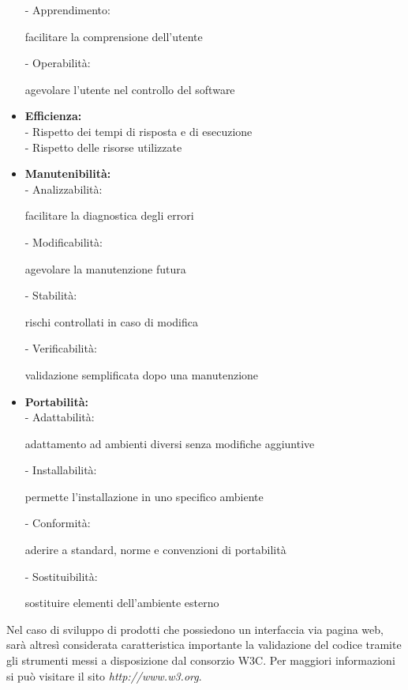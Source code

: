 \documentclass[11pt,a4paper]{article}
\begin{document}
\begin{itemize}
		- Apprendimento: \begin{small}facilitare la comprensione dell'utente \\\end{small}
		- Operabilità: \begin{small}agevolare l'utente nel controllo del software \end{small}
	\item \textbf{Efficienza:} \\
		- Rispetto dei tempi di risposta e di esecuzione \\
		- Rispetto delle risorse utilizzate
	\item \textbf{Manutenibilità:} \\
		- Analizzabilità: \begin{small}facilitare la diagnostica degli errori \\\end{small}
		- Modificabilità: \begin{small}agevolare la manutenzione futura \\\end{small}
		- Stabilità: \begin{small} rischi controllati in caso di modifica\\\end{small}
		- Verificabilità: \begin{small}validazione semplificata dopo una manutenzione\end{small}
	\item \textbf{Portabilità:} \\
		- Adattabilità: \begin{small}adattamento ad ambienti diversi senza modifiche aggiuntive\\\end{small}
		- Installabilità: \begin{small}permette l'installazione in uno specifico ambiente \\\end{small}
		- Conformità: \begin{small}aderire a standard, norme e convenzioni di portabilità \\\end{small}
		- Sostituibilità: \begin{small}sostituire elementi dell'ambiente esterno \end{small}
\end{itemize}
Nel caso di sviluppo di prodotti che possiedono un interfaccia via pagina web, sarà altresì considerata caratteristica importante la validazione del codice tramite gli strumenti messi a disposizione dal consorzio W3C. Per maggiori informazioni si può visitare il sito \textit{http://www.w3.org}.
\end{document}
